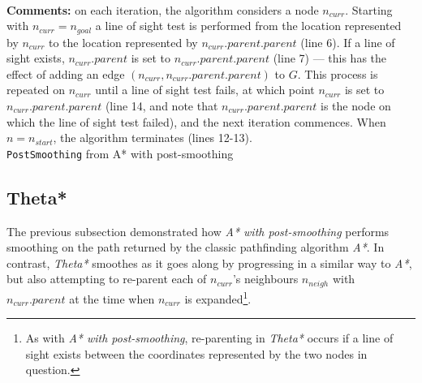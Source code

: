 \documentclass[12pt,notitlepage]{report}
\begin{document}
\begin{algorithm}
  \SetAlgoLined\DontPrintSemicolon
  \hspace{1cm} \\
  {\bfseries Comments:} on each iteration, the algorithm considers a node $n_{curr}$. Starting with $n_{curr} = n_{goal}$ a line of sight test is performed from the location represented by $n_{curr}$ to the location represented by $n_{curr}.parent.parent$ (line 6). If a line of sight exists, $n_{curr}.parent$ is set to $n_{curr}.parent.parent$ (line 7) --- this has the effect of adding an edge $(n_{curr},n_{curr}.parent.parent)$ to $G$. This process is repeated on $n_{curr}$ until a line of sight test fails, at which point $n_{curr}$ is set to $n_{curr}.parent.parent$ (line 14, and note that $n_{curr}.parent.parent$ is the node on which the line of sight test failed), and the next iteration commences. When $n = n_{start}$, the algorithm terminates (lines 12-13).\\
  \caption{{\tt PostSmoothing} from {\sc A* with post-smoothing}}
\end{algorithm} 

\subsection {Theta*}

The previous subsection demonstrated how {\em A* with post-smoothing} performs smoothing on the path returned by the classic pathfinding algorithm {\em A*}. In contrast, {\em Theta*} smoothes as it goes along by progressing in a similar way to {\em A*}, but also attempting to re-parent each of $n_{curr}$'s neighbours $n_{neigh}$ with $n_{curr}.parent$ at the time when $n_{curr}$ is expanded\footnote{As with {\em A* with post-smoothing}, re-parenting in {\em Theta*} occurs if a line of sight exists between the coordinates represented by the two nodes in question.}.\\
\end{document}
